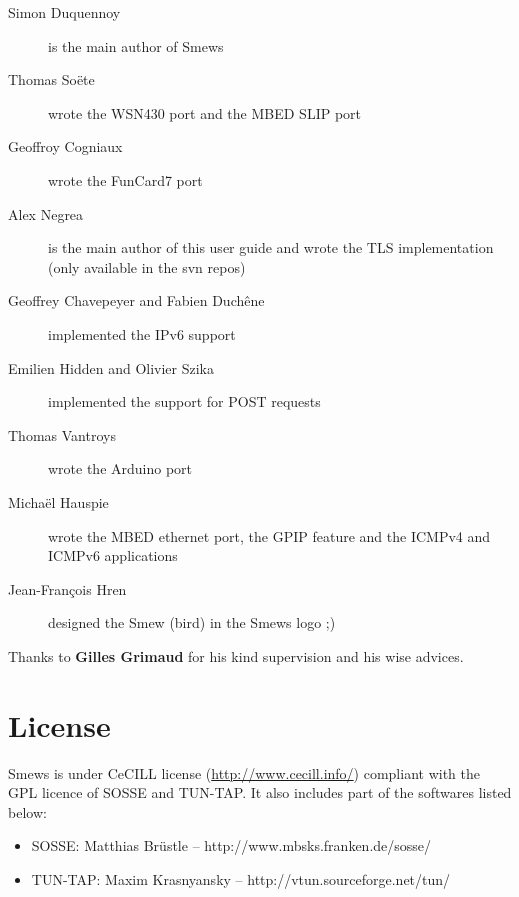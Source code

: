 \documentclass{report}
\begin{document}
\begin{description}
 \item[Simon Duquennoy] is the main author of Smews
 \item[Thomas So\"{e}te] wrote the WSN430 port and the MBED SLIP port
 \item[Geoffroy Cogniaux] wrote the FunCard7 port
 \item[Alex Negrea] is the main author of this user guide and wrote the TLS
implementation (only available in the svn repos)
 \item[Geoffrey Chavepeyer \textnormal{and} Fabien Duchêne] implemented the IPv6
support
\item[Emilien Hidden \textnormal{and} Olivier Szika] implemented the support
  for POST requests
 \item[Thomas Vantroys] wrote the Arduino port
 \item[Michaël Hauspie] wrote the MBED ethernet port, the GPIP feature and the
   ICMPv4 and ICMPv6 applications
 \item[Jean-Fran\c{c}ois Hren] designed the Smew (bird) in the Smews logo ;)
\end{description}
Thanks to \textbf{Gilles Grimaud} for his kind supervision and his wise advices.

\section{License}

Smews is under CeCILL license (\url{http://www.cecill.info/}) compliant with the GPL licence of SOSSE and TUN-TAP. It also includes part of the softwares listed below:
\begin{itemize}
 \item SOSSE: Matthias Br\"{u}stle -- http://www.mbsks.franken.de/sosse/
 \item TUN-TAP: Maxim Krasnyansky -- http://vtun.sourceforge.net/tun/
\end{itemize}
\end{document}
